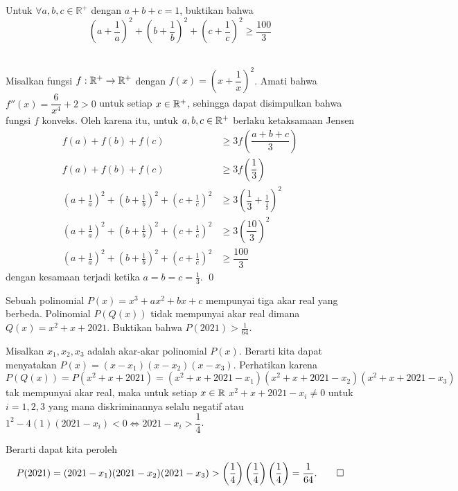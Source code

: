 \documentclass[12pt]{scrartcl}
\begin{document}
	\vspace{8pt}
	\begin{soalbaru} 
		 Untuk $\forall a,b,c \in\mathbb{R^+}$ dengan $a+b+c=1$, buktikan bahwa $$\left( a+\frac{1}{a} \right)^2+\left( b+\frac{1}{b} \right)^2+\left( c+\frac{1}{c} \right)^2 \ge \frac{100}{3}$$\\[-20pt]
		 
		 \begin{solusi}
		 Misalkan fungsi $f: \mathbb R^+ \rightarrow \mathbb R^+$ dengan $f(x)=\left(x+\dfrac{1}{x}\right)^2$. Amati bahwa $f''(x)=\dfrac{6}{x^4}+2>0$ untuk setiap $x \in \mathbb R^+$, sehingga dapat disimpulkan bahwa fungsi $f$ konveks. Oleh karena itu, untuk $a,b,c \in \mathbb R^+$ berlaku ketaksamaan Jensen
		 \begin{equation*}
		 \begin{split}
		 f(a)+f(b)+f(c) &\ge 3f\left(\dfrac{a+b+c}{3}\right)\\
		 f(a)+f(b)+f(c) &\ge 3f\left(\dfrac{1}{3}\right)\\
		 \left( a+\frac{1}{a} \right)^2+\left( b+\frac{1}{b} \right)^2+\left( c+\frac{1}{c} \right)^2 &\ge 3\left( \dfrac{1}{3}+\frac{1}{\frac{1}{3}} \right)^2\\
		 \left( a+\frac{1}{a} \right)^2+\left( b+\frac{1}{b} \right)^2+\left( c+\frac{1}{c} \right)^2 &\ge 3\left( \dfrac{10}{3} \right)^2\\
		 \left( a+\frac{1}{a} \right)^2+\left( b+\frac{1}{b} \right)^2+\left( c+\frac{1}{c} \right)^2 &\ge  \dfrac{100}{3} 
		 \end{split}
		 \end{equation*}
		 dengan kesamaan terjadi ketika $a=b=c=\frac{1}{3}$. \qed
		 \end{solusi}
	\end{soalbaru}
	
	\begin{soalbaru}
		Sebuah polinomial $P(x)=x^3+ax^2+bx+c$ mempunyai tiga akar real yang berbeda. Polinomial $P(Q(x))$ tidak mempunyai akar real dimana $Q(x)=x^2+x+2021$. Buktikan bahwa $P(2021)>\frac{1}{64}$.\\[-10pt]
		
		\begin{solusi}
		Misalkan $x_1,x_2,x_3$ adalah akar-akar polinomial $P(x)$. Berarti kita dapat menyatakan $P(x)=(x-x_1)(x-x_2)(x-x_3)$. 
		Perhatikan karena $$P(Q(x))=P(x^2+x+2021)=(x^2+x+2021-x_1)(x^2+x+2021-x_2)(x^2+x+2021-x_3)$$
		tak mempunyai akar real, maka untuk setiap $x\in \mathbb R$ $x^2+x+2021-x_i \neq 0$ untuk $i=1,2,3$ yang mana diskriminannya selalu negatif atau $1^2 - 4(1)(2021-x_i) < 0 \iff 2021-x_i > \dfrac14$.
		
		Berarti dapat kita peroleh 
		$$P(2021)=(2021-x_1)(2021-x_2)(2021-x_3) > \left(\dfrac14\right)\left(\dfrac14\right)\left(\dfrac14\right)=\dfrac{1}{64}.\qed$$ 
		\end{solusi}
	\end{soalbaru}
	
\end{document}
